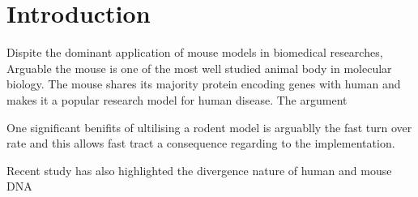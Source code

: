 \section{Introduction}

Dispite the dominant application of mouse models in biomedical researches, Arguable the mouse is one of the most well studied animal body in molecular biology. 
The mouse shares its majority protein encoding genes with human and makes it a popular research model for human disease. 
The argument 

One significant benifits of ultilising a rodent model is arguablly the fast turn over rate and this allows fast tract a consequence regarding to the implementation. \cite{Vandamme_2014}

Recent study has also highlighted the divergence nature of human and mouse DNA 